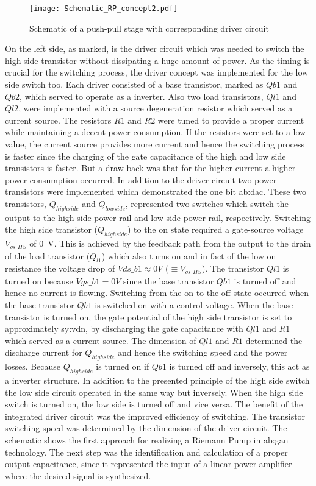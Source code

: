 \begin{figure}[ht]
	\centering
  \texttt{[image: Schematic\_RP\_concept2.pdf]}
	\caption{Schematic of a push-pull stage with corresponding driver circuit}
	\label{fig:SchematicRiemannPump}
\end{figure}

On the left side, as marked, is the driver circuit which was needed to switch the high side transistor without dissipating a huge amount of power.
As the timing is crucial for the switching process, the driver concept was implemented for the low side switch too.
Each driver consisted of a base transistor, marked as $Qb1$ and $Qb2$, which served to operate as a inverter.
Also two load transistors, $Ql1$ and $Ql2$, were implemented with a source degeneration resistor which served as a current source.
The resistors $R1$ and $R2$ were tuned to provide a proper current while maintaining a decent power consumption.
If the resistors were set to a low value, the current source provides more current and hence the switching process is faster since the charging of the gate capacitance of the high and low side transistors is faster.
But a draw back was that for the higher current a higher power consumption occurred.
In addition to the driver circuit two power transistors were implemented which demonstrated the one bit \gls{ab:dac}.
These two transistors, $Q_{highside}$ and $Q_{lowside}$, represented two switches which switch the output to the high side power rail and low side power rail, respectively.
Switching the high side transistor ($Q_{highside}$) to the on state required a gate-source voltage $V_{gs\_HS}$ of \SI{0}{\volt}.
This is achieved by the feedback path from the output to the drain of the load transistor ($Q_{l1}$) which also turns on and in fact of the low on resistance the voltage drop of $Vds\_b1 \approx 0 V$ ($\equiv V_{gs\_HS}$).
The transistor $Ql1$ is turned on because $Vgs\_b1 = 0 V$ since the base transistor $Qb1$ is turned off and hence no current is flowing.
Switching from the on to the off state occurred when the base transistor $Qb1$ is switched on with a control voltage.
When the base transistor is turned on, the gate potential of the high side transistor is set to approximately \gls{sy:vdn}, by discharging the gate capacitance with $Ql1$ and $R1$ which served as a current source.
The dimension of $Ql1$ and $R1$ determined the discharge current for $Q_{highside}$ and hence the switching speed and the power losses.
Because $Q_{highside}$ is turned on if $Qb1$ is turned off and inversely, this act as a inverter structure.
In addition to the presented principle of the high side switch the low side circuit operated in the same way but inversely.
When the high side switch is turned on, the low side is turned off and vice versa.
The benefit of the integrated driver circuit was the improved efficiency of switching.
The transistor switching speed was determined by the dimension of the driver circuit.
The schematic shows the first approach for realizing a Riemann Pump in \gls{ab:gan} technology.
The next step was the identification and calculation of a proper output capacitance, since it represented the input of a linear power amplifier where the desired signal is synthesized.
 
